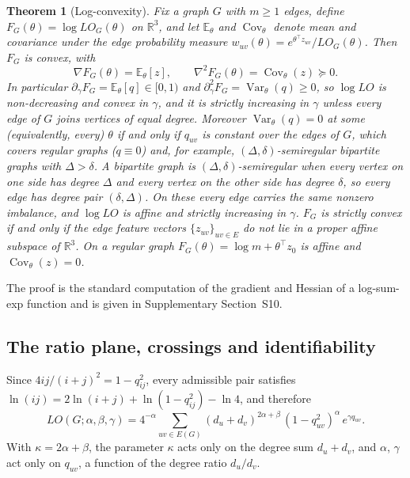 \documentclass[a5paper, 10pt]{article}
\theoremstyle{plain}
\newtheorem{theorem}{Theorem}
\theoremstyle{remark}
\theoremstyle{definition}
\begin{document}
  \begin{theorem}[Log-convexity]\label{thm:logconvex}
  Fix a graph $G$ with $m \ge 1$ edges, define
  $F_G(\theta) = \log LO_G(\theta)$ on $\mathbb{R}^3$, and let
  $\mathbb{E}_{\theta}$ and $\operatorname{Cov}_{\theta}$ denote mean
  and covariance under the edge probability measure
  $w_{uv}(\theta) = e^{\theta^{\top} z_{uv}} / LO_G(\theta)$. Then
  $F_G$ is convex, with
  \begin{equation*}
  \nabla F_G(\theta) = \mathbb{E}_{\theta}[z], \qquad
  \nabla^2 F_G(\theta) = \operatorname{Cov}_{\theta}(z) \succeq 0 .
  \end{equation*}
  In particular
  $\partial_{\gamma} F_G = \mathbb{E}_{\theta}[q] \in [0, 1)$ and
  $\partial^2_{\gamma} F_G = \operatorname{Var}_{\theta}(q) \ge 0$, so
  $\log LO$ is non-decreasing and convex in $\gamma$, and it is strictly
  increasing in $\gamma$ unless every edge of $G$ joins vertices of
  equal degree. Moreover
  $\operatorname{Var}_{\theta}(q) = 0$ at some (equivalently, every)
  $\theta$ if and only if $q_{uv}$ is constant over the edges of $G$,
  which covers regular graphs ($q \equiv 0$) and, for example,
  $(\Delta,\delta)$-semiregular bipartite graphs with $\Delta > \delta$. A bipartite graph is
  $(\Delta,\delta)$-semiregular when every vertex on one side has
  degree $\Delta$ and every vertex on the other side has degree
  $\delta$, so every edge has degree pair $(\delta,\Delta)$. On these every edge carries the
  same nonzero imbalance, and $\log LO$ is affine and strictly
  increasing in $\gamma$. $F_G$ is strictly convex if and only if the
  edge feature vectors $\{z_{uv}\}_{uv \in E}$ do not lie in a proper
  affine subspace of $\mathbb{R}^3$. On a regular graph
  $F_G(\theta) = \log m + \theta^{\top} z_0$ is affine and
  $\operatorname{Cov}_{\theta}(z) = 0$.
  \end{theorem}

  The proof is the standard computation of the gradient and Hessian of a
  log-sum-exp function and is given in Supplementary Section~S10.


  \subsection{The ratio plane, crossings and identifiability}\label{sec:ratioplane}

  Since $4ij/(i+j)^2 = 1 - q_{ij}^2$, every admissible pair satisfies
  $\ln(ij) = 2\ln(i+j) + \ln(1 - q_{ij}^2) - \ln 4$, and therefore
  \begin{equation}\label{eq:factor}
  LO(G;\alpha,\beta,\gamma) = 4^{-\alpha} \sum_{uv \in E(G)}
  (d_u + d_v)^{2\alpha+\beta}\,(1 - q_{uv}^2)^{\alpha}\, e^{\gamma q_{uv}}.
  \end{equation}
  With $\kappa = 2\alpha + \beta$, the parameter $\kappa$ acts only on
  the degree sum $d_u + d_v$, and $\alpha$, $\gamma$ act only on
  $q_{uv}$, a function of the degree ratio $d_u/d_v$.
\end{document}
